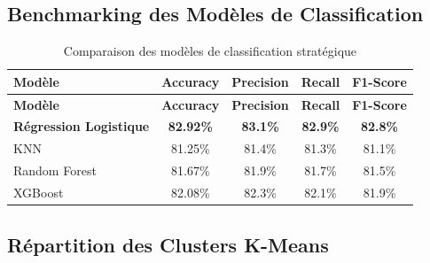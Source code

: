 \documentclass[11pt,a4paper,twoside]{report}
\begin{document}
\subsection{Benchmarking des Modèles de Classification}

\begin{center}
\small
\renewcommand{\arraystretch}{1.15}
\begin{longtable}{|p{3.5cm}|c|c|c|c|}
\caption{Comparaison des modèles de classification stratégique} \label{tab:bench_class} \\
\hline
\textbf{Modèle} & \textbf{Accuracy} & \textbf{Precision} & \textbf{Recall} & \textbf{F1-Score} \\
\hline
\endfirsthead
\hline
\textbf{Modèle} & \textbf{Accuracy} & \textbf{Precision} & \textbf{Recall} & \textbf{F1-Score} \\
\hline
\endhead
\hline
\endfoot
\hline
\endlastfoot

\textbf{Régression Logistique} & \textbf{82.92\%} & \textbf{83.1\%} & \textbf{82.9\%} & \textbf{82.8\%} \\
\hline
KNN & 81.25\% & 81.4\% & 81.3\% & 81.1\% \\
\hline
Random Forest & 81.67\% & 81.9\% & 81.7\% & 81.5\% \\
\hline
XGBoost & 82.08\% & 82.3\% & 82.1\% & 81.9\% \\
\hline

\end{longtable}
\end{center}

\subsection{Répartition des Clusters K-Means}
\end{document}
